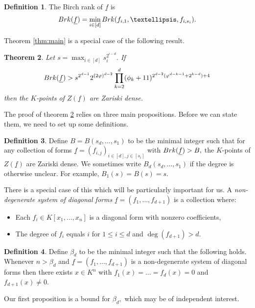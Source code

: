 \documentclass[10pt,a4paper]{amsart}
\let\ul\underline
\newtheorem{theorem}{Theorem}[section]
\theoremstyle{definition}
\newtheorem{definition}[theorem]{Definition}
\newcommand{\brk}{\textnormal{Brk}}
\begin{document}
\begin{definition}
    The Birch rank of $\ul{f}$ is 
    \[
    \brk(\ul{f}) = \min_{i\in [d]} \brk(f_{i,1},\ldots,f_{i,s_i}).
    \]
\end{definition}

 

Theorem \ref{thm:main} is a special case of the following result.

\begin{theorem}\label{thm:main-detailed}
    Let $s = \max_{i\in [d]} s_i^{2^{i-d}}.$ If 
    \[
    \brk(\ul{f}) > s^{2^{d-1}} 2^{(2\varphi)^{d-2}} \prod_{k=2}^d (\phi_k+11)^{2^{d-2}(\varphi^{d-k-1}+2^{k-d})+4}
    \]
    then the $K$-points of $Z(\ul{f})$ are Zariski dense.
\end{theorem}


The proof of theorem \ref{thm:main-detailed} relies on three main propositions. Before we can state them, we need to set up some definitions.

\begin{definition} 
Define $B = B(s_d,\ldots,s_1)$ to be the minimal integer such that for any collection of forms $\ul{f} = (f_{i,j})_{i\in [d],j\in [s_i]}$ with $\brk(\ul{f}) > B,$ the $K$-points of $Z(\ul{f})$ are Zariski dense.  We sometimes write $B_d(s_d,\ldots,s_1)$ if the degree is otherwise unclear. For example, $B_1(s) = B(s) = s.$ 
\end{definition}

There is a special case of this which will be particularly important for us. A \emph{non-degenerate system of diagonal forms} $\ul{f} = (f_1,\ldots,f_{d+1})$ is a collection where:
\begin{itemize}
    \item Each $f_i\in K[x_1,\ldots,x_n]$ is a diagonal form with nonzero coefficients,
    \item The degree of $f_i$ equals $i$ for $1\le i\le d$ and $\deg(f_{d+1}) > d.$ 
\end{itemize}
 

\begin{definition}
    Define $\beta_d$ to be the minimal integer such that the following holds. Whenever $n > \beta_d$ and $\ul{f} = (f_1,\ldots,f_{d+1})$ is a non-degenerate system of diagonal forms then there exists $x\in K^n$ with $f_1(x) = \ldots = f_d(x) = 0$ and $f_{d+1}(x)\neq 0.$
\end{definition}

Our first proposition is a bound for $\beta_d,$ which may be of independent interest.
\end{document}
